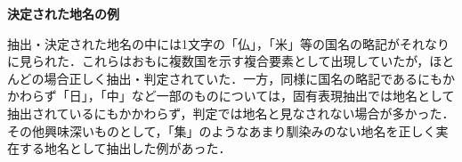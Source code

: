 
\textbf{決定された地名の例}

抽出・決定された地名の中には1文字の「仏」，「米」等の国名の略記がそれなりに見られた．これらはおもに複数国を示す複合要素として出現していたが，ほとんどの場合正しく抽出・判定されていた．一方，同様に国名の略記であるにもかかわらず「日」，「中」など一部のものについては，固有表現抽出では地名として抽出されているにもかかわらず，判定では地名と見なされない場合が多かった．その他興味深いものとして，「集」のようなあまり馴染みのない地名を正しく実在する地名として抽出した例があった．
